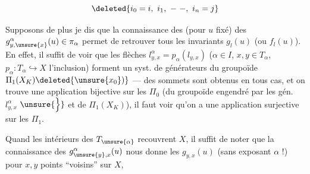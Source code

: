 

\[
\deleted{i_0=i,\ i_1,\ \mathord{-}\ \mathord{-},\ i_n=j}
\]



Supposons de plus    je dis que la connaissance des (pour $u$ fixé) des $g_{y,\unsure{x}}^\alpha(u)\in\pi_\alpha$  permet de retrouver tous les invariants $g_l(u)$ (ou $f_l(u)$). En effet, il suffit de voir que les flèches $l_{y,x}^\alpha=p_\alpha(l_{y,x})$ ($\alpha\in I$, $x,y\in T_\alpha$, $p_\alpha:T_\alpha\hookrightarrow X$ l'inclusion)  forment un syst. de générateurs du groupoïde $\Pi_1(X_K)\deleted{\unsure{x_0})}$ ---  des  sommets sont obtenus en tous cas, et on trouve une application bijective sur les $\Pi_0$ (du groupoïde engendré par les gén. $l_{y,x}^\alpha$   $\unsure{\Big\}}$ et de $\Pi_1(X_K)$), il faut voir qu'on a une application surjective sur les $\Pi_1$.

Quand les intérieurs des $T_{\unsure{\alpha}}$ recouvrent $X$, il suffit de noter que la connaissance des $g_{\unsure{y},x}^{\alpha}(u)$ nous donne les $g_{y,x}(u)$ (sans exposant $\alpha$ !) pour $x,y$ points ``voisins'' sur $X$,


